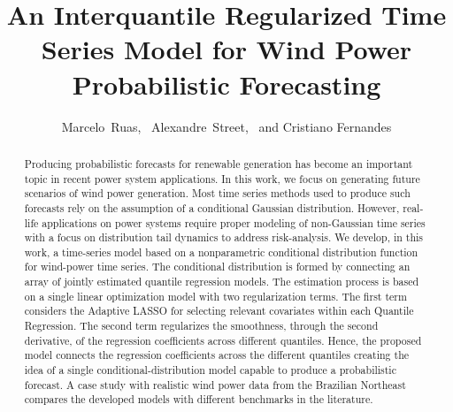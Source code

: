 \documentclass[journal]{IEEEtran}
\begin{document}
\title{An Interquantile Regularized Time Series Model for Wind Power Probabilistic Forecasting}

\author{Marcelo~Ruas,~%
	 	Alexandre~Street,~%
		and Cristiano Fernandes
	
}

\maketitle


\begin{abstract}

Producing probabilistic forecasts for renewable generation has become an important topic in recent power system applications. In this work, we focus on generating future scenarios of wind power generation. Most time series methods used to produce such forecasts rely on the assumption of a conditional Gaussian distribution. However, real-life applications on power systems require proper modeling of non-Gaussian time series with a focus on distribution tail dynamics to address risk-analysis.  
We develop, in this work, a time-series model based on a nonparametric conditional distribution function for wind-power time series. The conditional distribution is formed by connecting an array of jointly estimated quantile regression models. The estimation process is based on a single linear optimization model with two regularization terms. The first term considers the Adaptive LASSO for selecting relevant covariates within each Quantile Regression. The second term regularizes the smoothness, through the second derivative, of the regression coefficients across different quantiles. Hence, the proposed model connects the regression coefficients across the different quantiles creating the idea of a single conditional-distribution model capable to produce a probabilistic forecast.
A case study with realistic wind power data from the Brazilian Northeast compares the developed models with different benchmarks in the literature. %
\end{abstract}
\end{document}
